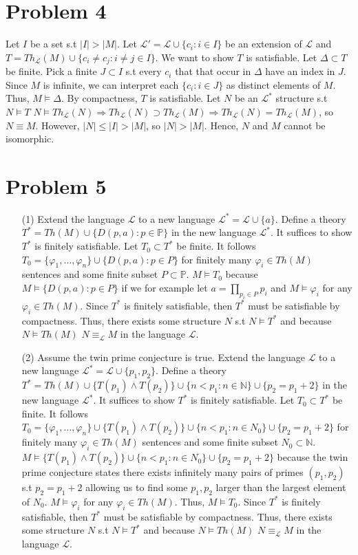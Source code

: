 \documentclass[10pt]{article}
\begin{document}
\section*{Problem 4}
Let $I$ be a set s.t $|I|>|M|$. Let $\mathcal{L}'=\mathcal{L}\cup\{c_i:i\in I\}$ be an extension of $\mathcal{L}$ and $T=Th_\mathcal{L}(M)\cup\{c_i\neq c_j:i\neq j\in I\}$.
We want to show $T$ is satisfiable. Let $\Delta\subset T$ be finite. Pick a finite $J\subset I$ s.t every $c_i$ that that occur in $\Delta$ have an index in $J$. 
Since $M$ is infinite, we can interpret each $\{c_i:i\in J\}$ as distinct elements of $M$. Thus, $M\models \Delta$. 
By compactness, $T$ is satisfiable.
Let $N$ be an $\mathcal{L}^*$ structure s.t $N\models T$ $N\models Th_\mathcal{L}(N)\Rightarrow Th_\mathcal{L}(N)\supset Th_\mathcal{L}(M)\Rightarrow Th_\mathcal{L}(N)= Th_\mathcal{L}(M)$, so $N\equiv M$. 
However, $|N|\le|I|>|M|$, so $|N|>|M|$. Hence, $N$ and $M$ cannot be isomorphic.
\section*{Problem 5}
\begin{itemize}
  \item [(1)] Extend the language $\mathcal{L}$ to a new language $\mathcal{L}^*=\mathcal{L}\cup\{a\}$. 
  Define a theory $T^*=Th(M)\cup\{D(p,a):p\in \mathbb{P}\}$ in the new language $\mathcal{L}^*$.
  It suffices to show $T^*$ is finitely satisfiable.
  Let $T_0\subset T^*$ be finite.
  It follows $T_0=\{\varphi_1,\ldots,\varphi_n\}\cup\{D(p,a):p\in P\}$ for finitely many $\varphi_i\in Th(M)$ sentences and some finite subset $P\subset \mathbb{P}$.
  $M\models T_0$ because $M\models\{D(p,a):p\in P\}$ if we for example let $\displaystyle a=\prod_{p_i\in P}p_i$ and $M\models \varphi_i$ for any $\varphi_i\in Th(M)$.
  Since $T^*$ is finitely satisfiable, then $T^*$ must be satisfiable by compactness.
  Thus, there exists some structure $N$ s.t $N\models T^*$ and because $N\models Th(M)$ $N\equiv_{\mathcal{L}} M$ in the language $\mathcal{L}$.
  \item [(2)] Assume the twin prime conjecture is true. 
  Extend the language $\mathcal{L}$ to a new language $\mathcal{L}^*=\mathcal{L}\cup\{p_1,p_2\}$.
  Define a theory $T^*=Th(M)\cup\{T(p_1)\land T(p_2)\}\cup\{n<p_1:n\in\mathbb{N}\}\cup\{p_2=p_1+2\}$ in the new language $\mathcal{L}^*$.
  It suffices to show $T^*$ is finitely satisfiable.
  Let $T_0\subset T^*$ be finite.
  It follows $T_0=\{\varphi_1,\ldots,\varphi_n\}\cup\{T(p_1)\land T(p_2)\}\cup\{n<p_1:n\in N_0\}\cup\{p_2=p_1+2\}$ for finitely many $\varphi_i\in Th(M)$ sentences and some finite subset $N_0\subset \mathbb{N}$.
  $M\models \{T(p_1)\land T(p_2)\}\cup\{n<p_1:n\in N_0\}\cup\{p_2=p_1+2\}$ because the twin prime conjecture states there exists infinitely many pairs of primes $(p_1,p_2)$ s.t $p_2=p_1+2$ allowing us to find some $p_1,p_2$ larger than the largest element of $N_0$. 
  $M\models \varphi_i$ for any $\varphi_i\in Th(M)$.
  Thus, $M\models T_0$.
  Since $T^*$ is finitely satisfiable, then $T^*$ must be satisfiable by compactness.
  Thus, there exists some structure $N$ s.t $N\models T^*$ and because $N\models Th(M)$ $N\equiv_{\mathcal{L}} M$ in the language $\mathcal{L}$.
\end{itemize}
\end{document}
